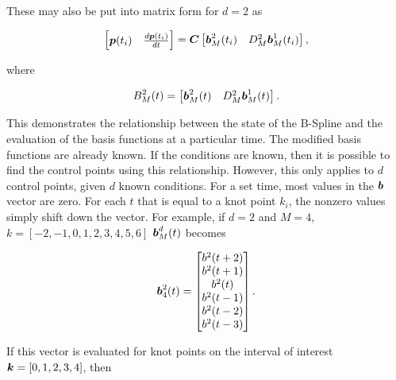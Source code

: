 These may also be put into matrix form for $d=2$ as

\begin{align}
    \begin{bmatrix}
        \boldsymbol{p}(t_i) & \frac{d\boldsymbol{p}(t_i)}{dt}
    \end{bmatrix}
	= \boldsymbol{C}
    \begin{bmatrix}
        \boldsymbol{b}_M^2(t_i) & D^2_M \boldsymbol{b}^1_M(t_i) 
    \end{bmatrix},
\end{align}

where 

\begin{align}
    B_M^2(t) = 
    \begin{bmatrix}
        \boldsymbol{b}_M^2(t) & D^2_M \boldsymbol{b}^1_M(t) 
    \end{bmatrix}.
\end{align}

This demonstrates the relationship between the state of the B-Spline and the evaluation of the basis functions at a particular time. 
The modified basis functions are already known. 
If the conditions are known, then it is possible to find the control points using this relationship.
However, this only applies to $d$ control points, given $d$ known conditions. 
For a set time, most values in the $\boldsymbol{b}$ vector are zero. 
For each $t$ that is equal to a knot point $k_i$, the nonzero values simply shift down the vector. 
For example, if $d = 2$ and $M = 4$, $k = [-2, -1, 0, 1, 2, 3, 4, 5, 6]$ $\boldsymbol{b}_M^d(t)$ becomes

\begin{align}
    \boldsymbol{b}_4^2(t) =
    \begin{bmatrix}
        b^2(t+2)\\
        b^2(t+1)\\
        b^2(t)\\
        b^2(t-1)\\
        b^2(t-2)\\
        b^2(t-3)\\
    \end{bmatrix}.
\end{align}

If this vector is evaluated for knot points on the interval of interest $\boldsymbol{k} = [0,1,2,3,4]$, then

